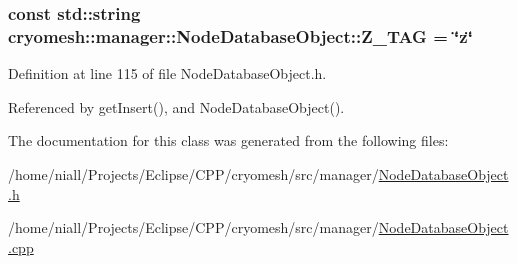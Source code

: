 \hypertarget{classcryomesh_1_1manager_1_1NodeDatabaseObject_a6ad97b44dd2f10fd83db1c62283f5bdd}{
\subsubsection[{\-Z\-\_\-\-T\-A\-G}]{\setlength{\rightskip}{0pt plus 5cm}const std\-::string {\bf cryomesh\-::manager\-::\-Node\-Database\-Object\-::\-Z\-\_\-\-T\-A\-G} = \char`\"{}z\char`\"{}}}\label{classcryomesh_1_1manager_1_1NodeDatabaseObject_a6ad97b44dd2f10fd83db1c62283f5bdd}


\-Definition at line 115 of file \-Node\-Database\-Object.\-h.



\-Referenced by get\-Insert(), and \-Node\-Database\-Object().



\-The documentation for this class was generated from the following files\-:\begin{DoxyCompactItemize}
\item 
/home/niall/\-Projects/\-Eclipse/\-C\-P\-P/cryomesh/src/manager/\hyperlink{NodeDatabaseObject_8h}{\-Node\-Database\-Object.\-h}\item 
/home/niall/\-Projects/\-Eclipse/\-C\-P\-P/cryomesh/src/manager/\hyperlink{NodeDatabaseObject_8cpp}{\-Node\-Database\-Object.\-cpp}\end{DoxyCompactItemize}
